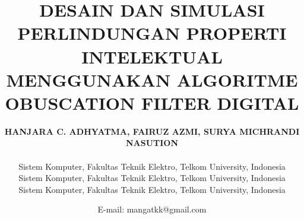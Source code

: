 \title{\vspace{-2.0cm} \textbf{DESAIN DAN SIMULASI PERLINDUNGAN PROPERTI INTELEKTUAL MENGGUNAKAN ALGORITME OBUSCATION FILTER DIGITAL}}
\author{\fontsize{10pt}{10pt}\textbf{HANJARA C. ADHYATMA, FAIRUZ AZMI, SURYA MICHRANDI NASUTION}\\
	\vspace{0.5pt}\\
	Sistem Komputer, Fakultas Teknik Elektro, Telkom University, Indonesia\\
	Sistem Komputer, Fakultas Teknik Elektro, Telkom University, Indonesia\\
	Sistem Komputer, Fakultas Teknik Elektro, Telkom University, Indonesia
}
\date{E-mail: mangatkk@gmail.com}